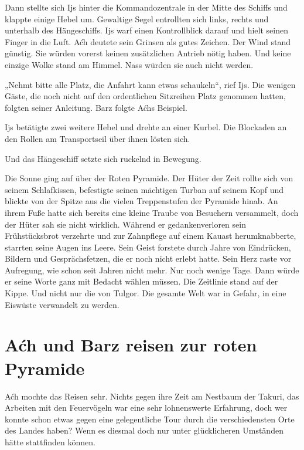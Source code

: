 Dann stellte sich Ijs hinter die Kommandozentrale in der Mitte des Schiffs und klappte einige Hebel um. Gewaltige Segel entrollten sich links, rechts und unterhalb des Hängeschiffs. Ijs warf einen Kontrollblick darauf und hielt seinen Finger in die Luft. Aćh deutete sein Grinsen als gutes Zeichen. Der Wind stand günstig. Sie würden vorerst keinen zusätzlichen Antrieb nötig haben. Und keine einzige Wolke stand am Himmel. Nass würden sie auch nicht werden.

„Nehmt bitte alle Platz, die Anfahrt kann etwas schaukeln“, rief Ijs. Die wenigen Gäste, die noch nicht auf den ordentlichen Sitzreihen Platz genommen hatten, folgten seiner Anleitung. Barz folgte Aćhs Beispiel.

Ijs betätigte zwei weitere Hebel und drehte an einer Kurbel. Die Blockaden an den Rollen am Transportseil über ihnen lösten sich.

Und das Hängeschiff setzte sich ruckelnd in Bewegung.



\trennzeichen



Die Sonne ging auf über der Roten Pyramide. Der Hüter der Zeit rollte sich von seinem Schlafkissen, befestigte seinen mächtigen Turban auf seinem Kopf und blickte von der Spitze aus die vielen Treppenstufen der Pyramide hinab. An ihrem Fuße hatte sich bereits eine kleine Traube von Besuchern versammelt, doch der Hüter sah sie nicht wirklich. Während er gedankenverloren sein Frühstücksbrot verzehrte und zur Zahnpflege auf einem Kauast herumknabberte, starrten seine Augen ins Leere. Sein Geist forstete durch Jahre von Eindrücken, Bildern und Gesprächsfetzen, die er noch nicht erlebt hatte. Sein Herz raste vor Aufregung, wie schon seit Jahren nicht mehr. Nur noch wenige Tage. Dann würde er seine Worte ganz mit Bedacht wählen müssen. Die Zeitlinie stand auf der Kippe. Und nicht nur die von Tulgor. Die gesamte Welt war in Gefahr, in eine Eiswüste verwandelt zu werden.





\newpage
\section{Aćh und Barz reisen zur roten Pyramide}



Aćh mochte das Reisen sehr. Nichts gegen ihre Zeit am Nestbaum der Takuri, das Arbeiten mit den Feuervögeln war eine sehr lohnenswerte Erfahrung, doch wer konnte schon etwas gegen eine gelegentliche Tour durch die verschiedensten Orte des Landes haben? Wenn es diesmal doch nur unter glücklicheren Umständen hätte stattfinden können.

